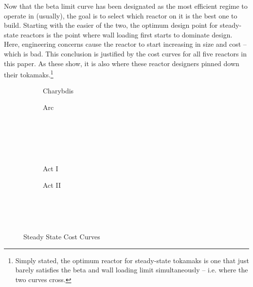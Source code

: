 Now that the beta limit curve has been designated as the most efficient regime to operate in (usually), the goal is to select which reactor on it is the best one to build. Starting with the easier of the two, the optimum design point for steady-state reactors is the point where wall loading first starts to dominate design. Here, engineering concerns cause the reactor to start increasing in size and cost -- which is bad. This conclusion is justified by the cost curves for all five reactors in this paper. As these show, it is also where these reactor designers pinned down their tokamaks.\footnote{ Simply stated, the optimum reactor for steady-state tokamaks is one that just barely satisfies the beta and wall loading limit simultaneously -- i.e. where the two curves cross. }

\begin{figure*}
    \centering
    \hfill 
    \begin{subfigure}[t]{0.45\textwidth}
        \centering
		\begin{adjustbox}{width=\textwidth}
			\Large
			
		\end{adjustbox}
        \caption{Charybdis}
    \end{subfigure}
    \hfill
    \begin{subfigure}[t]{0.45\textwidth}
        \centering
		\begin{adjustbox}{width=\textwidth}
			\Large
			
		\end{adjustbox}
        \caption{Arc}
    \end{subfigure}
    \hfill \hfill ~\\ ~\\ ~\\ ~\\
    \hfill 
    \begin{subfigure}[t]{0.45\textwidth}
        \centering
		\begin{adjustbox}{width=\textwidth}
			\Large
			
		\end{adjustbox}
        \caption{Act I}
    \end{subfigure}
    \hfill
    \begin{subfigure}[t]{0.45\textwidth}
        \centering
		\begin{adjustbox}{width=\textwidth}
			\Large
			
		\end{adjustbox}
        \caption{Act II}
    \end{subfigure}
    \hfill \hfill ~\\ ~\\ ~\\
    \caption{Steady State Cost Curves}
    \label{fig:steady_cost}
\end{figure*}

